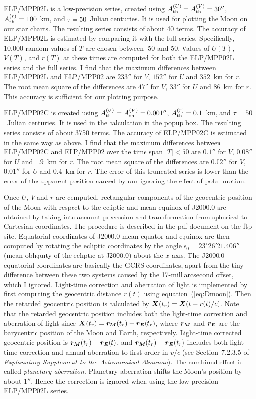 \documentclass[12pt]{article}
\newcommand{\ve}[1]{\mbox{\boldmath $#1$}}
\newcommand{\expl}{\href{http://www.uscibooks.com/urban.htm}{\it Explanatory Supplement to the Astronomical Almanac}}
\begin{document}
ELP/MPP02L is a low-precision series, created using 
$A^{(U)}_{\rm th}=A^{(V)}_{\rm th}=30''$, $A^{(r)}_{\rm th}=100$~km, and $\tau = 50$~Julian centuries. It is used for plotting the Moon on our star charts. 
The resulting series consists of about 40 terms. 
The accuracy of ELP/MPP02L is estimated by comparing it with the full series. 
Specifically, 10,000 random values of $T$ are chosen between -50 and 50. Values of 
$U(T)$, $V(T)$, and $r(T)$ at these times are computed for both the ELP/MPP02L series and the 
full series. I find that the maximum differences between ELP/MPP02L and ELP/MPP02 
are $233''$ for $V$, $152''$ for $U$ and $352$~km for $r$. The root mean square 
of the differences are $47''$ for $V$, $33''$ for $U$ and $86$~km for $r$. This accuracy 
is sufficient for our plotting purpose.

ELP/MPP02C is created using $A^{(U)}_{\rm th}=A^{(V)}_{\rm th}=0.001''$, 
$A^{(r)}_{\rm th}=0.1$~km, and $\tau = 50$~Julian centuries. It is used in 
the calculation in the popup box. The resulting series consists of about 3750 terms. 
The accuracy of ELP/MPP02C is estimated in the same way as above. I find that 
the maximum differences between ELP/MPP02C and ELP/MPP02 over the time 
span $|T|<50$ are $0.1''$ for $V$, $0.08''$ for $U$ and $1.9$~km for $r$. 
The root mean square of the differences are $0.02''$ for $V$, $0.01''$ for 
$U$ and $0.4$~km for $r$. The error of this truncated series is lower than 
the error of the apparent position caused by our ignoring the effect of 
polar motion.

Once $U$, $V$ and $r$ are computed, rectangular components of the geocentric 
position of the Moon with respect to the ecliptic and mean equinox of J2000.0 
are obtained by taking into account precession and transformation from spherical 
to Cartesian coordinates. The procedure is described in the pdf document on the ftp site. 
Equatorial coordinates of J2000.0 mean equator and equinox are then computed 
by rotating the ecliptic coordinates by the angle $\epsilon_0=23^\circ 26' 21.406''$ 
(mean obliquity of the ecliptic at J2000.0) about the $x$-axis. 
The J2000.0 equatorial coordinates are basically the GCRS coordinates, 
apart from the tiny difference 
between these two systems caused by the 17-milliarcsecond offset, which I ignored. 
Light-time correction and aberration of light is implemented by first computing 
the geocentric distance $r(t)$ using equation~(\ref{eq:Dmoon}). Then the retarded 
geocentric position is calculated by $\ve{X}(t_r) = \ve{X}(t-r(t)/c)$. Note that 
the retarded geocentric position includes both the light-time correction and 
aberration of light since $\ve{X}(t_r) = \ve{r_M}(t_r)-\ve{r_E}(t_r)$, 
where $\ve{r_M}$ and $\ve{r_E}$ are the barycentric position of the Moon and 
Earth, respectively. Light-time corrected geocentric position is 
$\ve{r_M}(t_r)-\ve{r_E}(t)$, and $\ve{r_M}(t_r)-\ve{r_E}(t_r)$ includes 
both light-time correction and annual aberration to first order in $v/c$ 
(see Section~7.2.3.5 of \expl). The combined effect is called 
{\em planetary aberration}. Planetary aberration shifts the Moon's position 
by about $1''$. Hence the 
correction is ignored when using the low-precision ELP/MPP02L series. 
\end{document}
